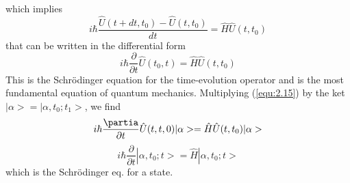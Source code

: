 which implies
$$
i\hbar \frac{\hat{U}(t+dt,t_0)-\hat{U}(t,t_0)}{dt} =
\hat{H}\hat{U}(t,t_0)
$$
that can be written in the differential form
\begin{equation}
  i\hbar \frac{\partial}{\partial t}\hat{U}(t_0,t) = \hat{H}
  \hat{U}(t,t_0)
  \label{equ:2.15}
\end{equation}
This is the Schrödinger equation for the time-evolution
operator and is the most fundamental equation of quantum
mechanics.
Multiplying (\ref{equ:2.15}) by the ket $|\alpha> =
|\alpha,t_0;t_1>$, we find
$$
i\hbar \frac{\partia}{\partial t} \hat{U}(t,t,0) |\alpha> =
\hat{H}\hat{U}(t,t_0) |\alpha>
$$
\begin{equation}
  i\hbar \frac{\partial}{\partial t} |\alpha,t_0;t> =
  \hat{H}|\alpha,t_0;t>
  \label{equ:2.16}
\end{equation}
which is the Schrödinger eq. for a state.

